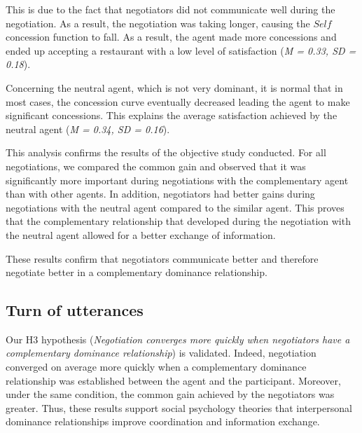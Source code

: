 \documentclass[10pt, a4paper, twocolumn]{article} %
\begin{document}
%	

This is due to the fact that negotiators did not communicate well during the negotiation. As a result, the negotiation was taking longer, causing the $Self$ concession function to fall. As a result, the agent made more concessions and ended up accepting a restaurant with a low level of satisfaction (\emph{M = 0.33, SD = 0.18}).

Concerning the neutral agent, which is not very dominant, it is normal that in most cases, the concession curve eventually decreased leading the agent to make significant concessions. This explains the average satisfaction achieved by the neutral agent (\emph{M = 0.34, SD = 0.16}).

This analysis confirms the results of the objective study conducted.
For all negotiations, we compared the common gain and observed that it was significantly more important during negotiations with the complementary agent than with other agents. In addition, negotiators had better gains during negotiations with the neutral agent compared to the similar agent. This proves that the complementary relationship that developed during the negotiation with the neutral agent allowed for a better exchange of information. 

These results confirm that negotiators communicate better and therefore negotiate better in a complementary dominance relationship.  


\subsection{Turn of utterances}
Our H3 hypothesis (\textit{Negotiation converges more quickly when negotiators have a complementary dominance relationship}) is validated. Indeed, negotiation converged on average more quickly when a complementary dominance relationship was established between the agent and the participant. Moreover, under the same condition, the common gain achieved by the negotiators was greater. Thus, these results support social psychology theories that interpersonal dominance relationships improve coordination and information exchange.
\end{document}
